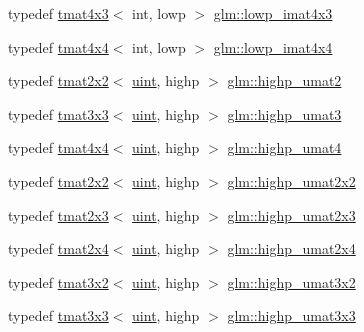 \begin{DoxyCompactItemize}
\item 
typedef \hyperlink{structglm_1_1tmat4x3}{tmat4x3}$<$ int, lowp $>$ \hyperlink{group__gtc__matrix__integer_ga76c201715b216ddd5d7de3c3759211f1}{glm\+::lowp\+\_\+imat4x3}
\item 
typedef \hyperlink{structglm_1_1tmat4x4}{tmat4x4}$<$ int, lowp $>$ \hyperlink{group__gtc__matrix__integer_ga46f8dc46c3dcde8fa2e8b8f645c0d9ef}{glm\+::lowp\+\_\+imat4x4}
\item 
typedef \hyperlink{structglm_1_1tmat2x2}{tmat2x2}$<$ \hyperlink{group__core__precision_ga4fd29415871152bfb5abd588334147c8}{uint}, highp $>$ \hyperlink{group__gtc__matrix__integer_ga113fe97aa8688eaa287a02f8362f3e47}{glm\+::highp\+\_\+umat2}
\item 
typedef \hyperlink{structglm_1_1tmat3x3}{tmat3x3}$<$ \hyperlink{group__core__precision_ga4fd29415871152bfb5abd588334147c8}{uint}, highp $>$ \hyperlink{group__gtc__matrix__integer_ga58bc8d0aeac88af0d38723b5cfa4fa67}{glm\+::highp\+\_\+umat3}
\item 
typedef \hyperlink{structglm_1_1tmat4x4}{tmat4x4}$<$ \hyperlink{group__core__precision_ga4fd29415871152bfb5abd588334147c8}{uint}, highp $>$ \hyperlink{group__gtc__matrix__integer_ga7b0e78c54432c7236d8b96473b7423ec}{glm\+::highp\+\_\+umat4}
\item 
typedef \hyperlink{structglm_1_1tmat2x2}{tmat2x2}$<$ \hyperlink{group__core__precision_ga4fd29415871152bfb5abd588334147c8}{uint}, highp $>$ \hyperlink{group__gtc__matrix__integer_gaeb546847abfc7c3c09ea8172987ebb16}{glm\+::highp\+\_\+umat2x2}
\item 
typedef \hyperlink{structglm_1_1tmat2x3}{tmat2x3}$<$ \hyperlink{group__core__precision_ga4fd29415871152bfb5abd588334147c8}{uint}, highp $>$ \hyperlink{group__gtc__matrix__integer_gab058a0a12ea7f604d92baeb7a0e54f3b}{glm\+::highp\+\_\+umat2x3}
\item 
typedef \hyperlink{structglm_1_1tmat2x4}{tmat2x4}$<$ \hyperlink{group__core__precision_ga4fd29415871152bfb5abd588334147c8}{uint}, highp $>$ \hyperlink{group__gtc__matrix__integer_gafcec07e857ea0445d93680411e86482c}{glm\+::highp\+\_\+umat2x4}
\item 
typedef \hyperlink{structglm_1_1tmat3x2}{tmat3x2}$<$ \hyperlink{group__core__precision_ga4fd29415871152bfb5abd588334147c8}{uint}, highp $>$ \hyperlink{group__gtc__matrix__integer_ga7484178233773045088b42f362dade86}{glm\+::highp\+\_\+umat3x2}
\item 
typedef \hyperlink{structglm_1_1tmat3x3}{tmat3x3}$<$ \hyperlink{group__core__precision_ga4fd29415871152bfb5abd588334147c8}{uint}, highp $>$ \hyperlink{group__gtc__matrix__integer_ga770b01686af4fbbb13bbd7bd97d60fe4}{glm\+::highp\+\_\+umat3x3}

\end{DoxyCompactItemize}
